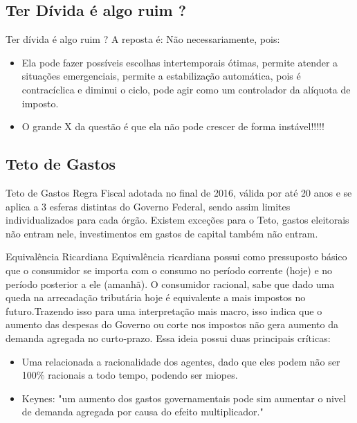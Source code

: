 \documentclass[xcolor=dvipsnames]{beamer}
\begin{document}
\subsection{Ter Dívida é algo ruim ?}
\begin{frame}{Ter dívida é algo ruim ?}
A reposta é: Não necessariamente, pois:
\begin{itemize}
    \item Ela pode fazer possíveis escolhas intertemporais ótimas, permite atender a situações emergenciais, permite a estabilização automática, pois é contracíclica e diminui o ciclo, pode agir como um controlador da alíquota de imposto.
    \item O grande X da questão é que ela não pode crescer de forma instável!!!!!
\end{itemize}
    
\end{frame}

\subsection{Teto de Gastos}
\begin{frame}{Teto de Gastos}
Regra Fiscal adotada no final de 2016, válida por até 20 anos e se aplica a 3 esferas distintas do Governo Federal, sendo assim limites individualizados para cada órgão. 
Existem exceções para o Teto, gastos eleitorais não entram nele, investimentos em gastos de capital também não entram. 
\end{frame}
\begin{frame}{Equivalência Ricardiana}
 Equivalência ricardiana possui como pressuposto básico que o consumidor se importa com o consumo no período corrente (hoje) e no período posterior a ele (amanhã). O consumidor racional, sabe que dado uma queda na arrecadação tributária hoje é equivalente a mais impostos no futuro.Trazendo isso para uma interpretação mais macro, isso indica que o aumento das despesas do Governo ou corte nos impostos não gera aumento da demanda agregada no curto-prazo.
 Essa ideia possui duas principais críticas:
 \begin{itemize}
     \item Uma relacionada a racionalidade dos agentes, dado que eles podem não ser 100$\%$ racionais a todo tempo, podendo ser miopes.
     \item Keynes: "um aumento dos gastos governamentais pode sim aumentar o nivel de demanda agregada por causa do efeito multiplicador."
 \end{itemize}
    
\end{frame}
\end{document}
